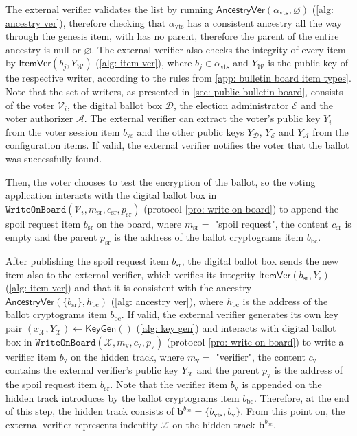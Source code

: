 The external verifier validates the list by running $\mathsf{AncestryVer}(\alpha_\mathrm{vts}, \varnothing)$ (\cref{alg: ancestry ver}), therefore checking that $\alpha_\mathrm{vts}$ has a consistent ancestry all the way through the genesis item, with has no parent, therefore the parent of the entire ancestry is null or $\varnothing$. The external verifier also checks the integrity of every item by $\mathsf{ItemVer}(b_j, Y_\mathcal{W})$ (\cref{alg: item ver}), where $b_j \in \alpha_\mathrm{vts}$ and $Y_\mathcal{W}$ is the public key of the respective writer, according to the rules from \cref{app: bulletin board item types}. Note that the set of writers, as presented in \cref{sec: public bulletin board}, consists of the voter $\mathcal{V}_i$, the digital ballot box $\mathcal{D}$, the election administrator $\mathcal{E}$ and the voter authorizer $\mathcal{A}$. The external verifier can extract the voter's public key $Y_i$ from the voter session item $b_\mathrm{vs}$ and the other public keys $Y_\mathcal{D}$, $Y_\mathcal{E}$ and $Y_\mathcal{A}$ from the configuration items. If valid, the external verifier notifies the voter that the ballot was successfully found.

Then, the voter chooses to test the encryption of the ballot, so the voting application interacts with the digital ballot box in $\mathtt{WriteOnBoard}(\mathcal{V}_i, m_\mathrm{sr}, c_\mathrm{sr}, p_\mathrm{sr})$ (protocol \ref{pro: write on board}) to append the spoil request item $b_\mathrm{sr}$ on the board, where $m_\mathrm{sr} = $ "spoil request", the content $c_\mathrm{sr}$ is empty and the parent $p_\mathrm{sr}$ is the address of the ballot cryptograms item $b_\mathrm{bc}$.

After publishing the spoil request item $b_\mathrm{sr}$, the digital ballot box sends the new item also to the external verifier, which verifies its integrity $\mathsf{ItemVer}(b_\mathrm{sr}, Y_i)$ (\cref{alg: item ver}) and that it is consistent with the ancestry $\mathsf{AncestryVer}(\{ b_\mathrm{sr} \}, h_\mathrm{bc})$ (\cref{alg: ancestry ver}), where $h_\mathrm{bc}$ is the address of the ballot cryptograms item $b_\mathrm{bc}$. If valid, the external verifier generates its own key pair $(x_\mathcal{X}, Y_\mathcal{X}) \gets \mathsf{KeyGen}()$ (\cref{alg: key gen}) and interacts with digital ballot box in $\mathtt{WriteOnBoard}(\mathcal{X}, m_\mathrm{v}, c_\mathrm{v}, p_\mathrm{v})$ (protocol \ref{pro: write on board}) to write a verifier item $b_\mathrm{v}$ on the hidden track, where $m_\mathrm{v} =$ "verifier", the content $c_\mathrm{v}$ contains the external verifier's public key $Y_\mathcal{X}$ and the parent $p_\mathrm{v}$ is the address of the spoil request item $b_\mathrm{sr}$. Note that the verifier item $b_\mathrm{v}$ is appended on the hidden track introduces by the ballot cryptograms item $b_\mathrm{bc}$. Therefore, at the end of this step, the hidden track consists of $\boldsymbol{b}^{b_\mathrm{bc}} = \{ b_\mathrm{vts}, b_\mathrm{v} \}$. From this point on, the external verifier represents indentity $\mathcal{X}$ on the hidden track $\boldsymbol{b}^{b_\mathrm{bc}}$.


